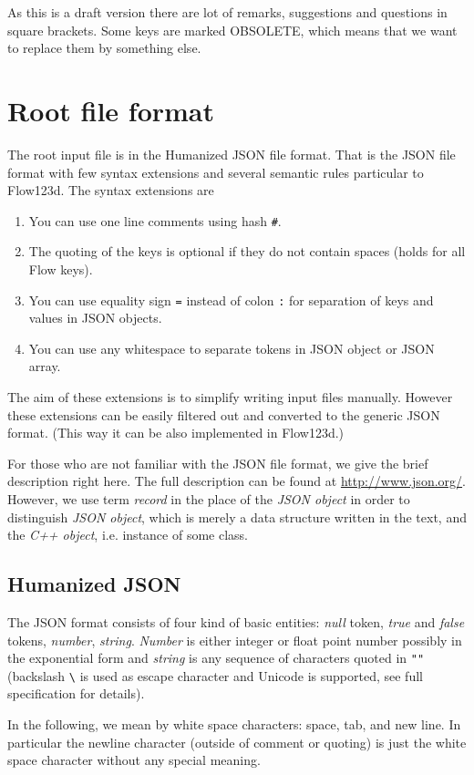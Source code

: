 \documentclass[12pt,a4paper]{report}
\begin{document}
As this is a draft version there are lot of remarks, suggestions and questions in square brackets. Some keys are marked OBSOLETE, which means that 
we want to replace them by something else.

\section{Root file format}
The root input file is in the Humanized JSON file format. That is the JSON file format with few syntax extensions and several semantic rules particular to
Flow123d. The syntax extensions are
\begin{enumerate}
\item You can use one line comments using hash \verb'#'.
\item The quoting of the keys is optional if they do not contain spaces (holds for all Flow keys).
\item You can use equality sign \verb'=' instead of colon \verb':' for separation of keys and values in JSON objects.
\item You can use any whitespace to separate tokens in JSON object or JSON array.
\end{enumerate}
The aim of these extensions is to simplify writing input files manually. However these extensions can be easily filtered out and converted to 
the generic JSON format. (This way it can be also implemented in Flow123d.)

For those who are not familiar with the JSON file format, we give the brief description right here. The full description can be found at
\url{http://www.json.org/}. However, we use term {\it record} in the place of the {\it JSON object} in order to distinguish {\it JSON object}, 
which is merely a data structure written in the text, and the {\it C++ object}, i.e. instance of some class. 

\subsection{Humanized JSON}
The JSON format consists of four kind of basic entities: 
{\it null} token, {\it true} and {\it false} tokens, {\it number}, {\it string}. {\it Number} is either integer or float point number 
possibly in the exponential form and {\it string} is any sequence of characters quoted in \verb'""' (backslash \verb"\" is used as escape character and 
Unicode is supported, see full specification for details). 

In the following, we mean by white space characters:
space, tab, and new line. In particular the newline character (outside of comment or quoting) is just the white space character without any special meaning.
\end{document}
